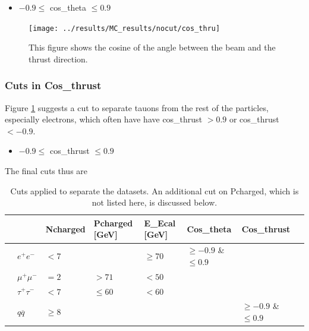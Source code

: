 \begin{itemize}
	\item{ $-0.9\le$ cos\_theta $\le0.9$}
\end{itemize}

\newpage
\begin{figure}[H]
\centering
\texttt{[image: ../results/MC\_results/nocut/cos\_thru]}
\caption[Cos\_thru in simulation data]{This figure shows the cosine of the angle between the beam and the thrust direction.}
\label{fig:cos_thru}
\end{figure}

\subsubsection{Cuts in Cos\_thrust}
Figure \ref{fig:cos_thru} suggests a cut to separate tauons from the rest of the particles, especially electrons, which often have have cos\_thrust $>0.9$ or cos\_thrust $<-0.9$.

\begin{itemize}
	\item{ $-0.9\le$ cos\_thrust $\le0.9$}
\end{itemize}

The final cuts thus are
\begin{table}[H]\centering
	\begin{tabular}{@{}llllllll@{}}
		\toprule
		&			&Ncharged	&Pcharged [GeV]	&E\_Ecal [GeV] &Cos\_theta				&Cos\_thrust\\ 
		\midrule
		&$e^+e^-$	&$<7$		&				&$\ge70$		&$\ge-0.9$ \& $\le0.9$	&\\
		&$\mu^+\mu^-$		&$=2$			&$>71$		&$<50$			&						&\\
		&$\tau^+\tau^-$		&$<7$		&$\le60$			&$<60$			&						&\\
		&$q\overline{q}$		&$\ge8$		&				&				&						&$\ge-0.9$ \& $\le0.9$	\\
		\bottomrule
	\end{tabular}
	\caption[Table of cuts]{Cuts applied to separate the datasets. An additional cut on Pcharged, which is not listed here, is discussed below.}
\end{table}
\newpage
